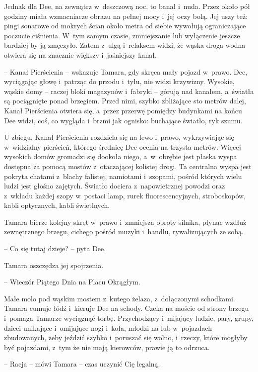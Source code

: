 \documentclass[oneside,polish,11pt,sfheadings]{mwbk}
\begin{document}
Jednak dla Dee, na zewnątrz w~deszczową noc, to banał i~nuda. Przez
około pół godziny miała wzmacniacze obrazu na pełnej mocy i~jej oczy
bolą. Jej uszy też: pingi sonarowe od mokrych ścian około metra od
siebie wywołują ograniczające poczucie ciśnienia. W~tym samym czasie,
zmniejszanie lub wyłączenie jeszcze bardziej by ją zmęczyło. Zatem z~ulgą i~relaksem widzi, że wąska droga wodna otwiera się na znacznie
większy i~jaśniejszy kanał.

-- Kanał Pierścienia -- wskazuje Tamara, gdy skręca mały pojazd w~prawo.
Dee, wyciągając głowę i~patrząc do przodu i~tyłu, nie widzi krzywizny.
Wysokie, wąskie domy -- raczej bloki magazynów i~fabryki -- górują nad
kanałem, a~światła są pociągnięte ponad brzegiem. Przed nimi, szybko
zbliżające sto metrów dalej, Kanał Pierścienia otwiera się, a~przez
przerwę pomiędzy budynkami na końcu Dee widzi, coś, co wygląda i~brzmi
jak ognisko: buchające światło, ryk szumu.

U zbiegu, Kanał Pierścienia rozdziela się na lewo i~prawo, wykrzywiając
się w~widzialny pierścień, którego średnicę Dee ocenia na trzysta
metrów. Więcej wysokich domów gromadzi się dookoła niego, a~w~obrębie
jest płaska wyspa dostępna za pomocą mostów z~otaczającej kolistej
drogi. Ta centralna wyspa jest pokryta chatami z~blachy falistej,
namiotami i~szopami, pośród których wielu ludzi jest głośno zajętych.
Światło dociera z~napowietrznej powodzi oraz z~wkładu każdej szopy w~postaci lamp, rurek fluorescencyjnych, stroboskopów, kabli optycznych,
kabli świetlnych.

Tamara bierze kolejny skręt w~prawo i~zmniejsza obroty silnika, płynąc
wzdłuż zewnętrznego brzegu, cichego pośród muzyki i~handlu,
rywalizujących ze sobą.

-- Co się tutaj dzieje? -- pyta Dee.

Tamara oszczędza jej spojrzenia. 

-- Wieczór Piątego Dnia na Placu
Okrągłym.

Małe molo pod wąskim mostem z~kutego żelaza, z~dołączonymi schodkami.
Tamara cumuje łódź i~kieruje Dee na schody. Czeka na moście od strony
brzegu i~pomaga Tamarze wyciągnąć torbę. Przychodzący i~mijający ludzie,
pary, grupy, dzieci unikające i~omijające nogi i~koła, młodzi na lub w~pojazdach zbudowanych, żeby jeździć szybko i~poruszać się wolno, i~rzeczy, które mogłyby być pojazdami, z~tym że nie mają kierowców, prawie
ją to odrzuca.

-- Racja -- mówi Tamara -- czas uczynić Cię legalną.
\end{document}

